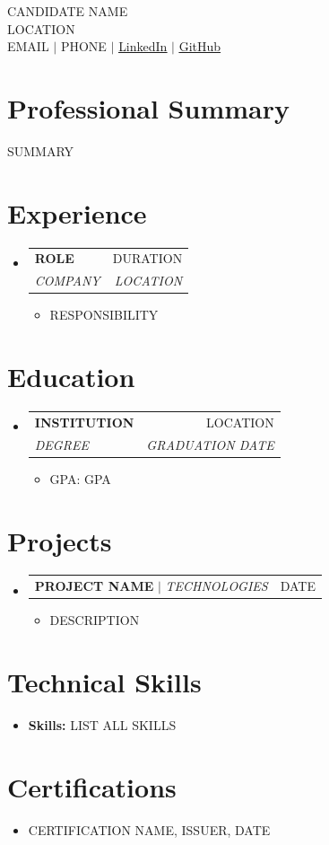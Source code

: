 \documentclass[letterpaper,10pt]{article}
\makeatletter
\newcommand{\resumeItem}[1]{\item\small{#1\vspace{-2pt}}}
\newcommand{\resumeSubheading}[4]{
  \vspace{-2pt}\item
  \begin{tabular*}{0.97\textwidth}[t]{l@{\extracolsep{\fill}}r}
    \textbf{#1} & #2 \\
    \textit{\small#3} & \textit{\small#4} \\
  \end{tabular*}\vspace{-7pt}
}
\newcommand{\resumeProjectHeading}[2]{
  \item
  \begin{tabular*}{0.97\textwidth}{l@{\extracolsep{\fill}}r}
    \small#1 & #2 \\
  \end{tabular*}\vspace{-7pt}
}
\newcommand{\resumeItemListStart}{\begin{itemize}[leftmargin=*]}
\newcommand{\resumeItemListEnd}{\end{itemize}\vspace{-5pt}}
\newcommand{\resumeSubHeadingListStart}{\begin{itemize}[leftmargin=0.15in,label={}]}
\newcommand{\resumeSubHeadingListEnd}{\end{itemize}}
\makeatother
\begin{document}
\begin{center}
  {\Huge\scshape CANDIDATE NAME} \\ \vspace{4pt}
  LOCATION \\ \vspace{2pt}
  \small EMAIL $|$ PHONE $|$
  \href{LINKEDIN}{\underline{LinkedIn}} $|$
  \href{GITHUB}{\underline{GitHub}}
\end{center}

\section{Professional Summary}
SUMMARY

\section{Experience}
\resumeSubHeadingListStart
  \resumeSubheading{ROLE}{DURATION}{COMPANY}{LOCATION}
  \resumeItemListStart
    \resumeItem{RESPONSIBILITY}
  \resumeItemListEnd
\resumeSubHeadingListEnd

\section{Education}
\resumeSubHeadingListStart
  \resumeSubheading{INSTITUTION}{LOCATION}{DEGREE}{GRADUATION DATE}
  \resumeItemListStart
    \resumeItem{GPA: GPA}
  \resumeItemListEnd
\resumeSubHeadingListEnd

\section{Projects}
\resumeSubHeadingListStart
  \resumeProjectHeading{\textbf{PROJECT NAME} $|$ \emph{TECHNOLOGIES}}{DATE}
  \resumeItemListStart
    \resumeItem{DESCRIPTION}
  \resumeItemListEnd
\resumeSubHeadingListEnd

\section{Technical Skills}
\begin{itemize}[leftmargin=0.15in,label={}]
  \small\item{\textbf{Skills: } LIST ALL SKILLS}
\end{itemize}

\section{Certifications}
\resumeSubHeadingListStart
  \resumeItem{CERTIFICATION NAME, ISSUER, DATE}
\resumeSubHeadingListEnd
\end{document}
